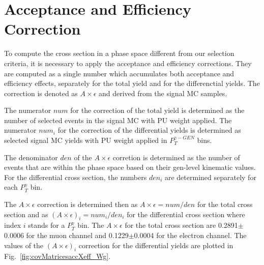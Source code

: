 \section{Acceptance and Efficiency Correction}
\label{sec:AccXEff}

To compute the cross section in a phase space different from our selection criteria, it is necessary to apply the acceptance and efficiency corrections. They are computed as a single number which accumulates both acceptance and efficiency effects, separately for the total yield and for the differenctial yields. The correction is denoted as $A \times \epsilon$ and derived from the signal MC samples.  

The numerator $num$ for the correction of the total yield is determined as the number of selected events in the signal MC with PU weight applied. The numerator $num_i$ for the correction of the differential yields is determined as selected signal MC yields with PU weight applied in $P_T^{\gamma-GEN}$ bins. 

The denominator $den$ of the $A \times \epsilon$ corretion is determined as the number of events that are within the phase space based on their gen-level kinematic values. For the differential cross section, the numbers $den_{i}$ are determined separately for each $P_T^\gamma$ bin.  

The $A \times \epsilon$ correction is determined then as $A \times \epsilon = num/{den}$ for the total cross section and as $(A \times \epsilon)_i = num_i/{den_i}$ for the differential cross section where index $i$ stands for a $P_T^{\gamma}$ bin. The $A \times \epsilon$ for the total cross section are 0.2891$\pm$0.0006 for the muon channel and 0.1229$\pm$0.0004 for the electron channel. The values of the $(A \times \epsilon)_i$ correction for the differential yields are plotted in Fig.~\ref{fig:covMatricesaccXeff_Wg}.

